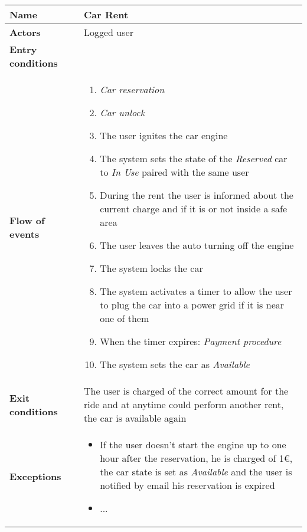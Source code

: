 \begin{tabular}{p{0.25\linewidth}p{0.75\linewidth}}
\toprule
\textbf{Name} & \textbf{Car Rent} \\
\midrule
\textbf{Actors} &  Logged user \\
\midrule
\textbf{Entry conditions} & \\
\midrule
\textbf{Flow of events} & 
\begin{enumerate}
	\item \emph{Car reservation}
	\item \emph{Car unlock}
	\item The user ignites the car engine
	\item The system sets the state of the \emph{Reserved} car to \emph{In Use} paired
	with the same user
	\item During the rent the user is informed about the current charge and if it is or not inside a
	safe area
	\item The user leaves the auto turning off the engine
	\item The system locks the car
    \item The system activates a timer to allow the user to plug the car into a power grid if it is
    near one of them
	\item When the timer expires: \emph{Payment procedure}
	\item The system sets the car as \emph{Available}
\end{enumerate} \\
\midrule
\textbf{Exit conditions} & 
The user is charged of the correct amount for the ride and at anytime could perform another rent, the car is available again\\
\midrule
\textbf{Exceptions} & 
\begin{itemize}
	\item If the user doesn't start the engine up to one hour after the reservation, he is charged of 1\euro , the car state is set as \emph{Available} and the user is notified by email his reservation is expired
	\item ...
\end{itemize} \\
\bottomrule
\end{tabular}
